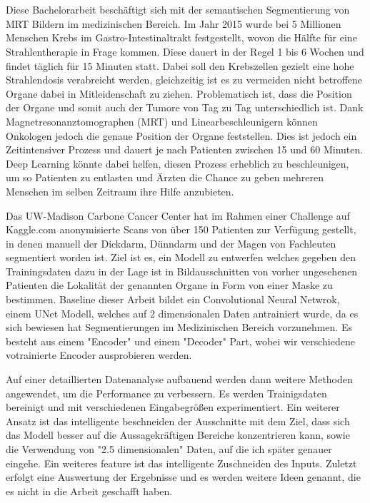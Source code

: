 \section*{}


Diese Bachelorarbeit beschäftigt sich mit der semantischen Segmentierung von MRT Bildern im medizinischen Bereich. Im Jahr 2015 wurde bei 5 Millionen Menschen Krebs im Gastro-Intestinaltrakt festgestellt, wovon die Hälfte für eine Strahlentherapie in Frage kommen. Diese dauert in der Regel 1 bis 6 Wochen und findet täglich für 15 Minuten statt. Dabei soll den Krebszellen gezielt eine hohe Strahlendosis verabreicht werden, gleichzeitig ist es zu vermeiden nicht betroffene Organe dabei in Mitleidenschaft zu ziehen. Problematisch ist, dass  die Position der Organe und somit auch der Tumore von Tag zu Tag unterschiedlich ist. Dank Magnetresonanztomographen (MRT) und Linearbeschleunigern können Onkologen jedoch die genaue Position der Organe feststellen. Dies ist jedoch ein Zeitintensiver Prozess und dauert je nach Patienten zwischen 15 und 60 Minuten. Deep Learning könnte dabei helfen, diesen Prozess erheblich zu beschleunigen, um so Patienten zu entlasten und Ärzten die Chance zu geben mehreren Menschen im selben Zeitraum ihre Hilfe anzubieten. 

Das UW-Madison Carbone Cancer Center hat im Rahmen einer Challenge auf Kaggle.com anonymisierte Scans von über 150 Patienten zur Verfügung gestellt, in denen manuell der Dickdarm, Dünndarm und der Magen von Fachleuten segmentiert worden ist. Ziel ist es, ein Modell zu entwerfen welches gegeben den Trainingsdaten dazu in der Lage ist in Bildausschnitten von vorher ungesehenen Patienten die Lokalität der genannten Organe in Form von einer Maske zu bestimmen. Baseline dieser Arbeit bildet ein Convolutional Neural Netwrok, einem UNet Modell, welches auf 2 dimensionalen Daten antrainiert wurde, da es sich bewiesen hat Segmentierungen im Medizinischen Bereich vorzunehmen. Es besteht aus einem "Encoder" und einem "Decoder" Part, wobei wir verschiedene votrainierte Encoder ausprobieren werden. 

Auf einer detaillierten Datenanalyse aufbauend werden dann weitere Methoden angewendet, um die Performance zu verbessern. Es werden Trainigsdaten bereinigt und mit verschiedenen Eingabegrößen experimentiert. Ein weiterer Ansatz ist das intelligente beschneiden der Ausschnitte mit dem Ziel, dass sich das Modell besser auf die Aussagekräftigen Bereiche konzentrieren kann, sowie die Verwendung von "2.5 dimensionalen" Daten, auf die ich später genauer eingehe. Ein weiteres feature ist das intelligente Zuschneiden des Inputs.
Zuletzt erfolgt eine Auswertung der Ergebnisse und es werden weitere Ideen genannt, die es nicht in die Arbeit geschafft haben.